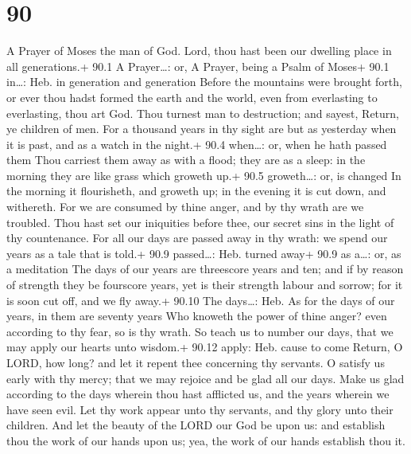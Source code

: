 \hypertarget{section-89}{%
\section{90}\label{section-89}}

A Prayer of Moses the man of God.  Lord, thou hast been our
dwelling place in all generations.+ 90.1 A Prayer\ldots: or, A Prayer,
being a Psalm of Moses+ 90.1 in\ldots: Heb. in generation and generation
 Before the mountains were brought forth, or ever thou hadst
formed the earth and the world, even from everlasting to everlasting,
thou art God.  Thou turnest man to destruction; and sayest,
Return, ye children of men.  For a thousand years in thy
sight are but as yesterday when it is past, and as a watch in the
night.+ 90.4 when\ldots: or, when he hath passed them  Thou
carriest them away as with a flood; they are as a sleep: in the morning
they are like grass which groweth up.+ 90.5 groweth\ldots: or, is
changed  In the morning it flourisheth, and groweth up; in
the evening it is cut down, and withereth.  For we are
consumed by thine anger, and by thy wrath are we troubled. 
Thou hast set our iniquities before thee, our secret sins in the light
of thy countenance.  For all our days are passed away in thy
wrath: we spend our years as a tale that is told.+ 90.9 passed\ldots:
Heb. turned away+ 90.9 as a\ldots: or, as a meditation  The
days of our years are threescore years and ten; and if by reason of
strength they be fourscore years, yet is their strength labour and
sorrow; for it is soon cut off, and we fly away.+ 90.10 The days\ldots:
Heb. As for the days of our years, in them are seventy years
 Who knoweth the power of thine anger? even according to
thy fear, so is thy wrath.  So teach us to number our days,
that we may apply our hearts unto wisdom.+ 90.12 apply: Heb. cause to
come  Return, O LORD, how long? and let it repent thee
concerning thy servants.  O satisfy us early with thy
mercy; that we may rejoice and be glad all our days.  Make
us glad according to the days wherein thou hast afflicted us, and the
years wherein we have seen evil.  Let thy work appear unto
thy servants, and thy glory unto their children.  And let
the beauty of the LORD our God be upon us: and establish thou the work
of our hands upon us; yea, the work of our hands establish thou it.

